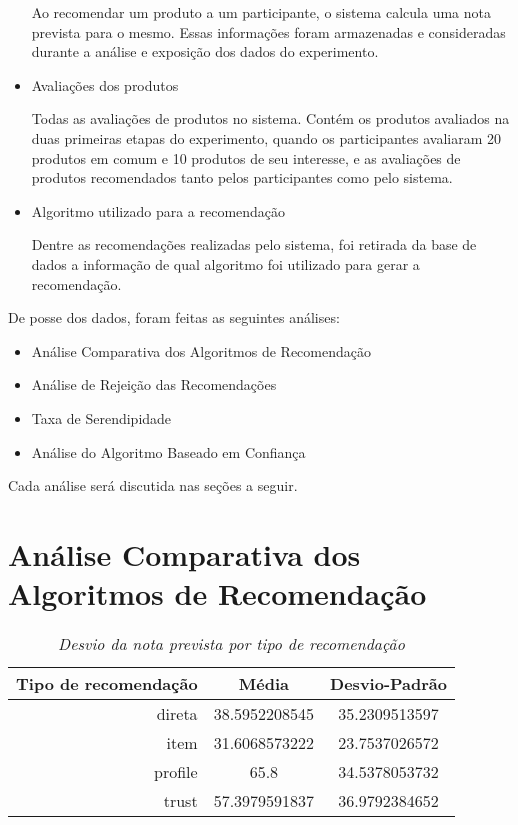 \begin{itemize}
	\subitem Ao recomendar um produto a um participante, o sistema calcula uma nota prevista para o mesmo. Essas informações foram armazenadas e consideradas durante a análise e exposição dos dados do experimento.
	
	\item Avaliações dos produtos
	
	\subitem Todas as avaliações de produtos no sistema. Contém os produtos avaliados na duas primeiras etapas do experimento, quando os participantes avaliaram 20 produtos em comum e 10 produtos de seu interesse, e as avaliações de produtos recomendados tanto pelos participantes como pelo sistema.
	
	\item Algoritmo utilizado para a recomendação
	
	\subitem Dentre as recomendações realizadas pelo sistema, foi retirada da base de dados a informação de qual algoritmo foi utilizado para gerar a recomendação.
	
\end{itemize}

 De posse dos dados, foram feitas as seguintes análises:
 
\begin{itemize}
	\item Análise Comparativa dos Algoritmos de Recomendação
	\item Análise de Rejeição das Recomendações
	\item Taxa de Serendipidade
	\item Análise do Algoritmo Baseado em Confiança
\end{itemize}

 Cada análise será discutida nas seções a seguir.
 
\section{Análise Comparativa dos Algoritmos de Recomendação}
\label{sec:analise_comparativa_dos_algoritmos_de_recomendacao}



\begin{table}
\centering
\begin{tabular}{|r|c|c|}
    \hline
    Tipo de recomendação & Média& Desvio-Padrão \\
\hline 
direta & 38.5952208545 & 35.2309513597 \\
\hline 
item & 31.6068573222 & 23.7537026572 \\
\hline 
profile & 65.8 & 34.5378053732 \\
\hline 
trust & 57.3979591837 & 36.9792384652 \\
\hline        
\end{tabular}
\caption{\it Desvio da nota prevista por tipo de recomendação}
\label{table:erro}
\end{table}


